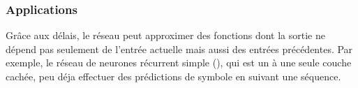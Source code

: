 \subsubsection*{Applications}
Grâce aux délais, le réseau peut approximer des fonctions dont la sortie ne dépend pas seulement de l'entrée actuelle mais aussi des entrées précédentes.
Par exemple, le réseau de neurones récurrent simple (\srn), qui est un \rmlp à une seule couche cachée, peu déja effectuer des prédictions de symbole en suivant une séquence.
